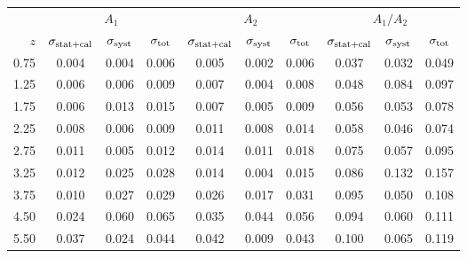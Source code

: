\begin{tabular}{r|ccc|ccc|ccc}
\toprule
 & \multicolumn{3}{c|}{$A_1$} & \multicolumn{3}{c|}{$A_2$} & \multicolumn{3}{c}{$A_1/A_2$}\\
$z$ & $\sigma_{\rm stat+cal}$ & $\sigma_{\rm syst}$ & $\sigma_{\rm tot}$ & $\sigma_{\rm stat+cal}$ & $\sigma_{\rm syst}$ & $\sigma_{\rm tot}$ & $\sigma_{\rm stat+cal}$ & $\sigma_{\rm syst}$ & $\sigma_{\rm tot}$\\
\midrule
0.75 & 0.004 & 0.004 & 0.006 & 0.005 & 0.002 & 0.006 & 0.037 & 0.032 & 0.049\\
1.25 & 0.006 & 0.006 & 0.009 & 0.007 & 0.004 & 0.008 & 0.048 & 0.084 & 0.097\\
1.75 & 0.006 & 0.013 & 0.015 & 0.007 & 0.005 & 0.009 & 0.056 & 0.053 & 0.078\\
2.25 & 0.008 & 0.006 & 0.009 & 0.011 & 0.008 & 0.014 & 0.058 & 0.046 & 0.074\\
2.75 & 0.011 & 0.005 & 0.012 & 0.014 & 0.011 & 0.018 & 0.075 & 0.057 & 0.095\\
3.25 & 0.012 & 0.025 & 0.028 & 0.014 & 0.004 & 0.015 & 0.086 & 0.132 & 0.157\\
3.75 & 0.010 & 0.027 & 0.029 & 0.026 & 0.017 & 0.031 & 0.095 & 0.050 & 0.108\\
4.50 & 0.024 & 0.060 & 0.065 & 0.035 & 0.044 & 0.056 & 0.094 & 0.060 & 0.111\\
5.50 & 0.037 & 0.024 & 0.044 & 0.042 & 0.009 & 0.043 & 0.100 & 0.065 & 0.119\\
\bottomrule
\end{tabular}

